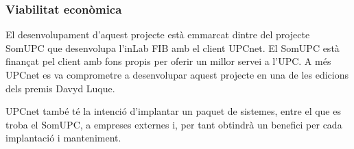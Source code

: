 
\subsubsection{Viabilitat econòmica}

El desenvolupament d'aquest projecte està emmarcat dintre del projecte SomUPC que desenvolupa l'inLab FIB amb el client UPCnet. El SomUPC està finançat pel client amb fons propis per oferir un millor servei a l'UPC. A més UPCnet es va comprometre a desenvolupar aquest projecte en una de les edicions dels premis Davyd Luque\cite{premi_upcnet}.

UPCnet també té la intenció d'implantar un paquet de sistemes, entre el que es troba el SomUPC, a empreses externes i,  per tant obtindrà un benefici per cada implantació i manteniment.